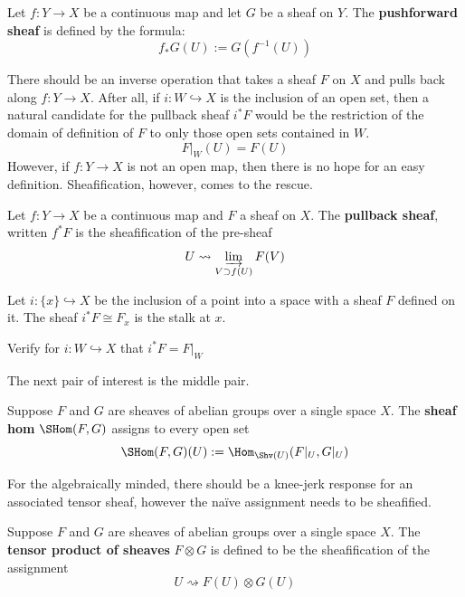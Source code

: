 \begin{defn}
Let $f:Y\to X$ be a continuous map and let $G$ be a sheaf on $Y$. The \textbf{pushforward sheaf} is defined by the formula:
\[
f_*G(U):=G(f^{-1}(U))
\]
\end{defn}

There should be an inverse operation that takes a sheaf $F$ on $X$ and pulls back along $f:Y\to X$. After all, if $i:W\hookrightarrow X$ is the inclusion of an open set, then a natural candidate for the pullback sheaf $i^*F$ would be the restriction of the domain of definition of $F$ to only those open sets contained in $W$.
\[
F|_W(U)=F(U)
\]
However, if $f:Y\to X$ is not an open map, then there is no hope for an easy definition. Sheafification, however, comes to the rescue.

\begin{defn}
Let $f:Y\to X$ be a continuous map and $F$ a sheaf on $X$. The \textbf{pullback sheaf}, written $f^*F$ is the sheafification of the pre-sheaf
\[
U\rightsquigarrow \varinjlim_{V\supset f(U)} F(V)
\]
\end{defn}

\begin{ex}
Let $i:\{x\}\hookrightarrow X$ be the inclusion of a point into a space with a sheaf $F$ defined on it. The sheaf $i^*F\cong F_x$ is the stalk at $x$.
\end{ex}
\begin{exr}
Verify for $i:W\hookrightarrow X$ that $i^*F=F|_W$
\end{exr}

The next pair of interest is the middle pair.
\begin{defn}
Suppose $F$ and $G$ are sheaves of abelian groups over a single space $X$. The \textbf{sheaf hom} $\SHom(F,G)$ assigns to every open set
\[
\SHom(F,G)(U):=\Hom_{\Shv(U)}(F|_U,G|_U)
\]
\end{defn}

For the algebraically minded, there should be a knee-jerk response for an associated tensor sheaf, however the na\"ive assignment needs to be sheafified.

\begin{defn}
Suppose $F$ and $G$ are sheaves of abelian groups over a single space $X$. The \textbf{tensor product of sheaves} $F\otimes G$ is defined to be the sheafification of the assignment
\[
U\rightsquigarrow F(U)\otimes G(U)
\]
\end{defn}

